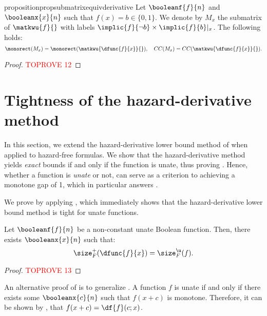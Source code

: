 \documentclass[acmsmall, nonacm, authorversion]{acmart}
\begin{document}
\begin{restatable}{proposition}{propsubmatrixequivderivative}\label{prop:submatrix-of-derive-p-equiv-derivative}
Let $\booleanf{f}{n}$ and $\booleanx{x}{n}$ such that $f(x)=b\in\{0,1\}$. We denote by $M_x$ the submatrix of $\matkwu{f}{}$ with labels $\implic{f}{\neg b}\times \implic{f}{b}|_x$. The following holds:
\[
\monorect(M_x)=\monorect(\matkwu{\dfunc{f}{x}}{}), \quad
CC(M_x)=CC(\matkwu{\dfunc{f}{x}}{}).
\]
\end{restatable}
\begin{proof}\textcolor{red}{TOPROVE 12}\end{proof}

\section{Tightness of the hazard-derivative method}\label{sec:tightness-of-hdm}
In this section, we extend the hazard-derivative lower bound method of \cite{IKL+19} when applied to hazard-free formulas. We show that the hazard-derivative method yields \emph{exact} bounds if and only if the function is unate, thus proving . Hence, whether a function is \emph{unate} or not, can serve as a criterion to achieving a monotone gap of 1, which in particular answers .

We prove  by applying , which immediately shows that the hazard-derivative lower bound method is tight for unate functions.

\begin{proposition}\label{prop:kw-f-not-break-if}
Let $\booleanf{f}{n}$ be a non-constant unate Boolean function. Then, there exists $\booleanx{x}{n}$ such that:
\[
\size_{F}^{+}(\dfunc{f}{x}) = \size_{F}^{\u}(f).
\]
\end{proposition}
\begin{proof}\textcolor{red}{TOPROVE 13}\end{proof}

\begin{remark}
An alternative proof of  is to generalize \cite[Corollary 4.5]{IKL+19}. A function $f$ is unate if and only if there exists some $\booleanx{c}{n}$ such that $f(x+c)$ is monotone. Therefore, it can be shown by \cite[Lemma 4.4]{IKL+19}, that $f(x+c)=\df{f}(c;x)$.
\end{remark}
\end{document}
